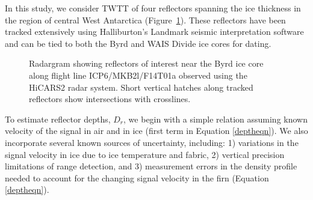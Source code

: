 In this study, we consider TWTT of four reflectors spanning the ice thickness in the region of central West Antarctica (Figure~\ref{fig:layergram}). These reflectors have been tracked extensively using Halliburton's Landmark seismic interpretation software and can be tied to both the Byrd and WAIS Divide ice cores for dating. %

\begin{figure}[h]\label{fig:layergram}
\centering
{}
\caption{Radargram showing reflectors of interest near the Byrd ice core along flight line ICP6/MKB2l/F14T01a observed using the HiCARS2 radar system. Short vertical hatches along tracked reflectors show intersections with crosslines.}
\end{figure}


To estimate reflector depths, $D_r$, we begin with a simple relation assuming known velocity of the signal in air and in ice (first term in Equation \ref{deptheqn}). We also incorporate several known sources of uncertainty, including: 1) variations in the signal velocity in ice due to ice temperature and fabric, 2) vertical precision limitations of range detection, and 3) measurement errors in the density profile needed to account for the changing signal velocity in the firn (Equation \ref{deptheqn}).

